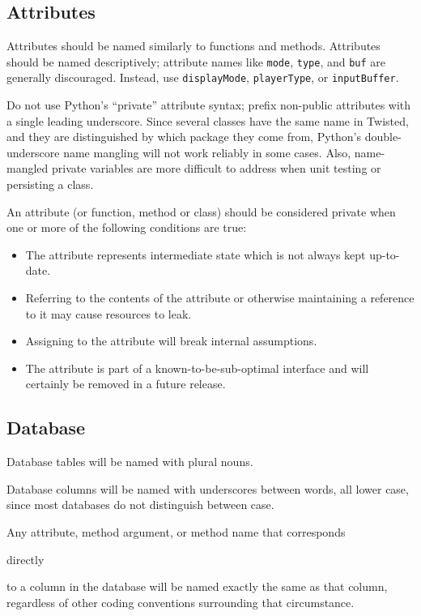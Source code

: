 \subsection{Attributes}


Attributes should be named similarly to functions and     methods. Attributes should be named descriptively; attribute     names like \texttt{mode}, \texttt{type}, and     \texttt{buf} are generally discouraged. Instead, use     \texttt{display\linebreak[1]Mode}, \texttt{player\linebreak[1]Type}, or     \texttt{input\linebreak[1]Buffer}.

Do not use Python's ``private'' attribute syntax; prefix     non-public attributes with a single leading underscore. Since     several classes have the same name in Twisted, and they are     distinguished by which package they come from, Python's     double-underscore name mangling will not work reliably in some     cases. Also, name-mangled private variables are more difficult     to address when unit testing or persisting a class.

An attribute (or function, method or class) should be     considered private when one or more of the following conditions     are true:\begin{itemize}
\item The attribute represents intermediate state which is not       always kept up-to-date.
\item Referring to the contents of the attribute or otherwise       maintaining a reference to it may cause resources to       leak.
\item Assigning to the attribute will break internal       assumptions.
\item The attribute is part of a known-to-be-sub-optimal       interface and will certainly be removed in a future       release.
\end{itemize}


\subsection{Database}


Database tables will be named with plural nouns.

Database columns will be named with underscores between     words, all lower case, since most databases do not distinguish     between case.

Any attribute, method argument, or method name that     corresponds \begin{em}directly\end{em} to a column in the database will     be named exactly the same as that column, regardless of other     coding conventions surrounding that circumstance.

